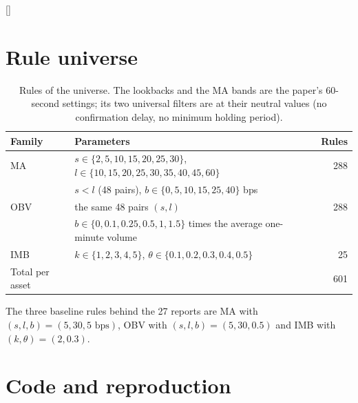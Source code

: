\documentclass[11pt]{article}
\newcommand{\sectionbreak}{\clearpage}
\begin{document}
\appendix
{}[{\color{accent}\titlerule[0.8pt]}]

\section{Rule universe}
\label{sec:rules}

\begin{table}[H]
  \centering
  \small
  \caption{Rules of the universe. The lookbacks and the MA bands are the paper's
  60-second settings; its two universal filters are at their neutral values (no
  confirmation delay, no minimum holding period).}
  \begin{tabular}{llr}
    \toprule
    Family & Parameters & Rules \\
    \midrule
    MA  & $s \in \{2, 5, 10, 15, 20, 25, 30\}$, $l \in \{10, 15, 20, 25, 30, 35, 40, 45, 60\}$ & 288 \\
        & $s < l$ (48 pairs), $b \in \{0, 5, 10, 15, 25, 40\}$ bps & \\
    \addlinespace
    OBV & the same 48 pairs $(s, l)$ & 288 \\
        & $b \in \{0, 0.1, 0.25, 0.5, 1, 1.5\}$ times the average one-minute volume & \\
    \addlinespace
    IMB & $k \in \{1, 2, 3, 4, 5\}$, $\theta \in \{0.1, 0.2, 0.3, 0.4, 0.5\}$ & 25 \\
    \midrule
    Total per asset & & 601 \\
    \bottomrule
  \end{tabular}
\end{table}

The three baseline rules behind the 27 reports are MA with $(s, l, b) = (5, 30,
5\text{ bps})$, OBV with $(s, l, b) = (5, 30, 0.5)$ and IMB with $(k, \theta) =
(2, 0.3)$.

\renewcommand{\sectionbreak}{\vspace{2em}}
\section{Code and reproduction}
\label{sec:code}
\end{document}
